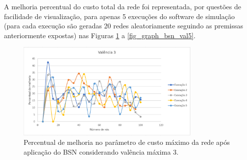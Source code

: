A melhoria percentual do custo total da rede foi representada, por questões de facilidade de visualização, para apenas 5 execuções do software de simulação (para cada execução são geradas 20 redes aleatoriamente seguindo as premissas anteriormente expostas) nas Figuras \ref{fig_graph_bsn_val3} a \ref{fig_graph_bsn_val5}.


\begin{figure} [ht]%
	\centering
	\includegraphics[width=0.8\textwidth]{./figuras/BSN-valencia3-5exec-grafico.png} %
		\caption[Melhoria de custo máximo com valência 3]{Percentual de melhoria no parâmetro de custo máximo da rede após aplicação do BSN considerando valência máxima 3.}
		\label{fig_graph_bsn_val3}
\end{figure}


